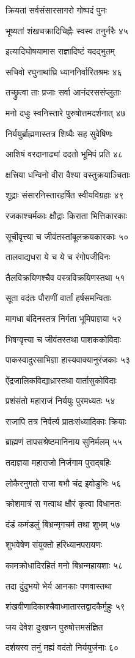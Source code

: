 क्रियतां सर्वसंसारसागरो गोष्पदं पुनः

भूष्यतां शंखचक्रादिचिह्नैः स्वस्व तनुर्नरैः ४५

इत्यादिघोषयामास राज्ञादिष्टं यदद्भुतम्

सचिवो रघुनाथांघ्रि ध्याननिर्वारितश्रमः ४६

तच्छ्रुत्वा ताः प्रजाः सर्वा आनंदरससंप्लुताः

मनो दधुः स्वनिस्तारे पुरुषोत्तमदर्शनात् ४७

निर्ययुर्ब्राह्मणास्तत्र शिष्यैः सह सुवेषिणः

आशिषं वरदानाढ्यां ददतो भूमिपं प्रति ४८

क्षत्त्रिया धन्विनो वीरा वैश्या वस्तुक्रयाञ्चिताः

शूद्राः संसारनिस्तारहर्षित स्वीयविग्रहाः ४९

रजकाश्चर्मकाः क्षौद्राः किराता भित्तिकारकाः

सूचीवृत्त्या च जीवंतस्तांबूलक्रयकारकाः ५०

तालवाद्यधरा ये च ये च रंगोपजीविनः

तैलविक्रयिणश्चैव वस्त्रविक्रयिणस्तथा ५१

सूता वदंतः पौराणीं वार्तां हर्षसमन्विताः

मागधा बंदिनस्तत्र निर्गता भूमिपाज्ञया ५२

भिषग्वृत्त्या च जीवंतस्तथा पाशककोविदाः

पाकस्वादुरसाभिज्ञा हास्यवाक्यानुरंजकाः ५३

ऐंद्रजालिकविद्याध्रास्तथा वार्तासुकोविदाः

प्रशंसंतो महाराजं निर्ययुः पुरमध्यतः ५४

राजापि तत्र निर्वर्त्य प्रातःसंध्यादिकाः क्रियाः

ब्राह्मणं तापसश्रेष्ठमानिनाय सुनिर्मलम् ५५

तदाज्ञया महाराजो निर्जगाम पुराद्बहिः

लोकैरनुगतो राजा बभौ चंद्र इवोडुभिः ५६

क्रोशमात्रं स गत्वाथ क्षौरं कृत्वा विधानतः

दंडं कमंडलुं बिभ्रन्मृगचर्म तथा शुभम् ५७

शुभवेषेण संयुक्तो हरिध्यानपरायणः

कामक्रोधादिरहितं मनो बिभ्रन्महायशाः ५८

तदा दुंदुभयो भेर्य आनकाः पणवास्तथा

शंखवीणादिकाश्चैवाध्मातास्तद्वादकैर्मुहुः ५९

जय देवेश दुःखघ्न पुरुषोत्तमसंज्ञित

दर्शयस्व तनुं मह्यं वदंतो निर्ययुर्जनाः ६०

